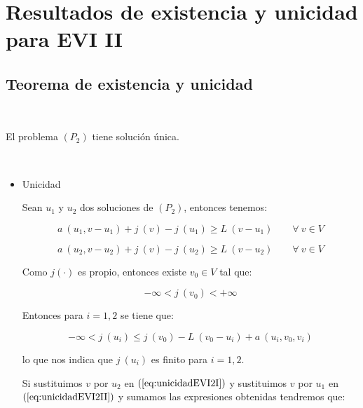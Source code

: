 \section{Resultados de existencia y unicidad para EVI II}

\subsection{Teorema de existencia y unicidad}

\begin{teorema} \label{th:exisEVIII}
\ \newline

El problema $(P_2)$ tiene soluci\'on \'unica.
\end{teorema}

\begin{demosteorema}
\ \newline
\begin{itemize}
\item Unicidad \newline

Sean $u_1$ y $u_2$ dos soluciones de $(P_2)$, entonces tenemos:

\begin{equation} \label{eq:unicidadEVI2I}
a\ (u_1,v-u_1)+j\ (v)-j\ (u_1) \ge L\ (v-u_1) \qquad \forall \ v \in V
\end{equation}

\begin{equation} \label{eq:unicidadEVI2II}
a\ (u_2,v-u_2)+j\ (v)-j\ (u_2) \ge L\ (v-u_2) \qquad \forall \ v \in V
\end{equation}

Como $j(\cdot )$ es propio, entonces existe $v_0 \in V$ tal que:

\begin{displaymath}
-\infty < j\ (v_0) < + \infty
\end{displaymath}

Entonces para $i=1,2$ se tiene que:

\begin{displaymath}
-\infty < j\ (u_i) \le j\ (v_0)- L\ (v_0-u_i)+a\ (u_i,v_0,v_i)
\end{displaymath}

lo que nos indica que $j\ (u_i)$ es finito para $i=1,2$.\newline

Si sustituimos $v$ por $u_2$ en $(\ref{eq:unicidadEVI2I})$ y sustituimos $v$
por $u_1$ en $(\ref{eq:unicidadEVI2II})$ y sumamos las expresiones obtenidas
tendremos que:


\end{itemize}
\end{demosteorema}

